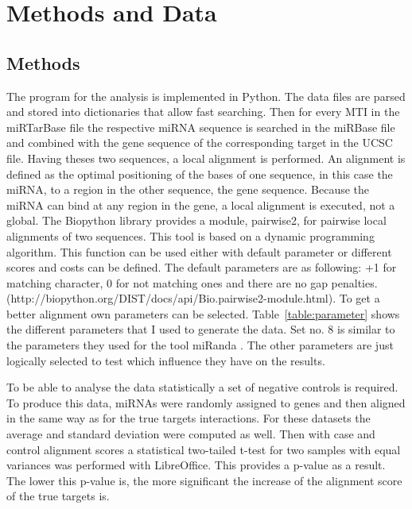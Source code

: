 \documentclass[12pt]{article}
\begin{document}
\section{Methods and Data}
\subsection{Methods}
The program for the analysis is implemented in Python. The data files are parsed and stored into dictionaries that allow fast searching. Then for every MTI in the miRTarBase file the respective miRNA sequence is searched in the miRBase file and combined with the gene sequence of the corresponding target in the UCSC file. Having theses two sequences, a local alignment is performed. An alignment is defined as the optimal positioning of the bases of one sequence, in this case the miRNA, to a region in the other sequence, the gene sequence. Because the miRNA can bind at any region in the gene, a local alignment is executed, not a global. The Biopython library provides a module, pairwise2, for pairwise local alignments of two sequences. This tool is based on a dynamic programming algorithm. This function can be used either with default parameter or different scores and costs can be defined. The default parameters are as following: +1 for matching character, 0 for not matching ones and there are no gap penalties. (http://biopython.org/DIST/docs/api/Bio.pairwise2-module.html). To get a better alignment own parameters can be selected. Table~\ref{table:parameter} shows the different parameters that I used to generate the data. Set no. 8 is similar to the parameters they used for the tool miRanda \cite{Enright}. The other parameters are just logically selected to test which influence they have on the results. 

To be able to analyse the data statistically a set of negative controls is required. To produce this data, miRNAs were randomly assigned to genes and then aligned in the same way as for the true targets interactions. For these datasets the average and standard deviation were computed as well. Then with case and control alignment scores a statistical two-tailed t-test for two samples with equal variances was performed with LibreOffice. This provides a p-value as a result. The lower this p-value is, the more significant the increase of the alignment score of the true targets is.
\end{document}
